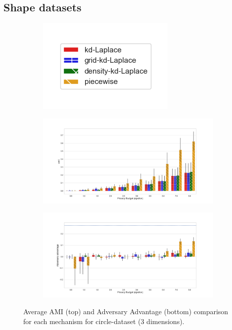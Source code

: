 \subsection{Shape datasets}

\begin{figure}[H]
  \centering
  \begin{subfigure}{0.30\textwidth}
    \includegraphics[width=\textwidth]{Results/kd-laplace/ami_bar_comparison_legend.png}
  \end{subfigure}
  \begin{subfigure}{1\textwidth}
    \includegraphics[width=1\textwidth]{Results/nd-laplace/ami_circle-dataset_comparison.png}
  \end{subfigure}
  \begin{subfigure}{1\textwidth}
    \includegraphics[width=1\textwidth]{Results/nd-laplace/attack_adv_circle-dataset_comparison.png}
  \end{subfigure}
  \caption{Average AMI (top) and Adversary Advantage (bottom) comparison for each mechanism for circle-dataset (3 dimensions).}
  \label{fig:utility_circle-dataset_comparison_nd_plot}
\end{figure}
